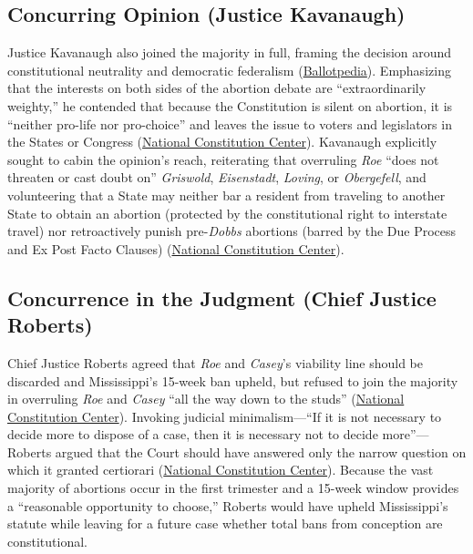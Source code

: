 \documentclass[12pt]{article}
\begin{document}
\subsection{Concurring Opinion (Justice Kavanaugh)}

Justice Kavanaugh also joined the majority in full, framing the decision around constitutional neutrality and democratic federalism (\href{https://ballotpedia.org/Dobbs_v._Jackson_Women\%E2\%80\%99s_Health_Organization}{Ballotpedia}). Emphasizing that the interests on both sides of the abortion debate are ``extraordinarily weighty,'' he contended that because the Constitution is silent on abortion, it is ``neither pro-life nor pro-choice'' and leaves the issue to voters and legislators in the States or Congress (\href{https://constitutioncenter.org/the-constitution/supreme-court-case-library/dobbs-v-jackson-womens-health-organization}{National Constitution Center}). Kavanaugh explicitly sought to cabin the opinion's reach, reiterating that overruling \textit{Roe} ``does not threaten or cast doubt on'' \textit{Griswold}, \textit{Eisenstadt}, \textit{Loving}, or \textit{Obergefell}, and volunteering that a State may neither bar a resident from traveling to another State to obtain an abortion (protected by the constitutional right to interstate travel) nor retroactively punish pre-\textit{Dobbs} abortions (barred by the Due Process and Ex Post Facto Clauses) (\href{https://constitutioncenter.org/the-constitution/supreme-court-case-library/dobbs-v-jackson-womens-health-organization}{National Constitution Center}).

\subsection{Concurrence in the Judgment (Chief Justice Roberts)}

Chief Justice Roberts agreed that \textit{Roe} and \textit{Casey}'s viability line should be discarded and Mississippi's 15-week ban upheld, but refused to join the majority in overruling \textit{Roe} and \textit{Casey} ``all the way down to the studs'' (\href{https://constitutioncenter.org/the-constitution/supreme-court-case-library/dobbs-v-jackson-womens-health-organization}{National Constitution Center}). Invoking judicial minimalism---``If it is not necessary to decide more to dispose of a case, then it is necessary not to decide more''---Roberts argued that the Court should have answered only the narrow question on which it granted certiorari (\href{https://constitutioncenter.org/the-constitution/supreme-court-case-library/dobbs-v-jackson-womens-health-organization}{National Constitution Center}). Because the vast majority of abortions occur in the first trimester and a 15-week window provides a ``reasonable opportunity to choose,'' Roberts would have upheld Mississippi's statute while leaving for a future case whether total bans from conception are constitutional.
\end{document}
